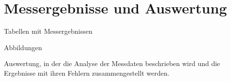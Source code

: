 \section{Messergebnisse und Auswertung}

Tabellen mit Messergebnissen

Abbildungen

Auswertung, in der die Analyse der Messdaten beschrieben wird und die Ergebnisse mit ihren Fehlern zusammengestellt werden.